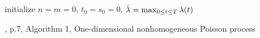 \begin{algorithm}[htpb]

\SetAlgoLined
{}

initialize $n = m = 0$, $t_0 = s_0 = 0$, $\Bar{\lambda} = \max_{0 \leq t \leq T} \lambda(t)$\;
\caption{\cite{lewis1979simulation}, p.7, Algorithm 1, One-dimensional nonhomogeneous Poisson process}\label{algo:1d_inhomogenous_pp}
\end{algorithm}
